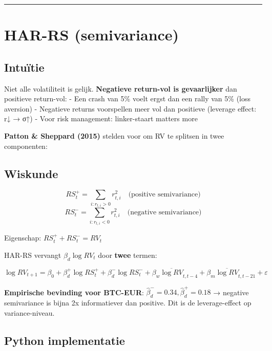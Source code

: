 \begin{center}\rule{0.5\linewidth}{0.5pt}\end{center}

\hypertarget{har-rs-semivariance}{%
\section{HAR-RS (semivariance)}\label{har-rs-semivariance}}

\hypertarget{intuuxeftie-2}{%
\subsection{Intuïtie}\label{intuuxeftie-2}}

Niet alle volatiliteit is gelijk. \textbf{Negatieve return-vol is gevaarlijker} dan positieve return-vol:
- Een crash van 5\% voelt ergst dan een rally van 5\% (loss aversion)
- Negatieve returns voorspellen meer vol dan positieve (leverage effect: r↓ → σ↑)
- Voor risk management: linker-staart matters more

\textbf{Patton \& Sheppard (2015)} stelden voor om RV te splitsen in twee componenten:

\hypertarget{wiskunde}{%
\subsection{Wiskunde}\label{wiskunde}}

\[RS^+_t = \sum_{i: r_{t,i} > 0} r_{t,i}^2 \quad\text{(positive semivariance)}\]
\[RS^-_t = \sum_{i: r_{t,i} < 0} r_{t,i}^2 \quad\text{(negative semivariance)}\]

Eigenschap: \(RS^+_t + RS^-_t = RV_t\)

HAR-RS vervangt \(\beta_d \log RV_t\) door \textbf{twee} termen:

\[\log RV_{t+1} = \beta_0 + \beta_d^+ \log RS^+_t + \beta_d^- \log RS^-_t + \beta_w \overline{\log RV}_{t,t-4} + \beta_m \overline{\log RV}_{t,t-21} + \varepsilon\]

\textbf{Empirische bevinding voor BTC-EUR}: \(\hat\beta_d^- = 0.34, \hat\beta_d^+ = 0.18\) → negative semivariance is bijna 2x informatiever dan positive. Dit is de leverage-effect op variance-niveau.

\hypertarget{python-implementatie-1}{%
\subsection{Python implementatie}\label{python-implementatie-1}}

